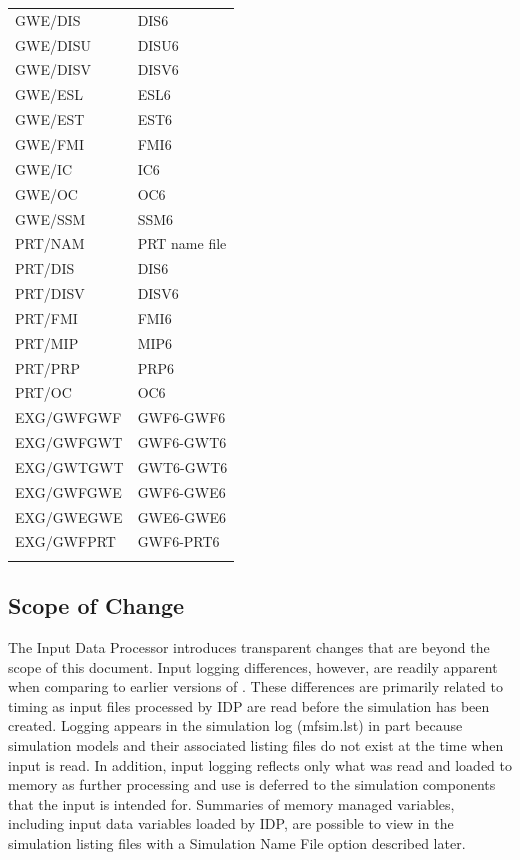 \begin{longtable}{p{6cm} p{4cm}}
GWE/DIS & DIS6 \\ 
GWE/DISU & DISU6 \\
GWE/DISV & DISV6 \\
GWE/ESL & ESL6 \\
GWE/EST & EST6 \\
GWE/FMI & FMI6 \\
GWE/IC & IC6 \\
GWE/OC & OC6 \\
GWE/SSM & SSM6 \\
\hline
PRT/NAM & PRT name file \\
PRT/DIS & DIS6 \\ 
PRT/DISV & DISV6 \\
PRT/FMI & FMI6 \\
PRT/MIP & MIP6 \\
PRT/PRP & PRP6 \\
PRT/OC & OC6 \\
\hline
EXG/GWFGWF & GWF6-GWF6 \\
EXG/GWFGWT & GWF6-GWT6 \\
EXG/GWTGWT & GWT6-GWT6 \\
EXG/GWFGWE & GWF6-GWE6 \\
EXG/GWEGWE & GWE6-GWE6 \\
EXG/GWFPRT & GWF6-PRT6 \\
\hline
\label{table:idmsupported}
\end{longtable}

\subsection{Scope of Change}

The Input Data Processor introduces transparent changes that are beyond the scope of this document.  Input logging differences, however, are readily apparent when comparing to earlier versions of \mf.  These differences are primarily related to timing as input files processed by IDP are read before the simulation has been created.  Logging appears in the simulation log (mfsim.lst) in part because simulation models and their associated listing files do not exist at the time when input is read.  In addition, input logging reflects only what was read and loaded to memory as further processing and use is deferred to the simulation components that the input is intended for.  Summaries of memory managed variables, including input data variables loaded by IDP, are possible to view in the simulation listing files with a Simulation Name File option described later. 

